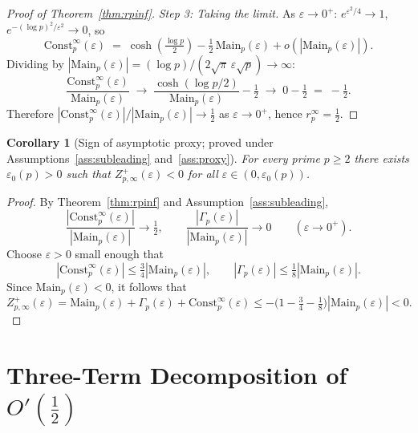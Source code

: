 \documentclass[11pt]{article}
\newtheorem{corollary}[theorem]{Corollary}
\begin{document}
\begin{proof}[Proof of Theorem~\ref{thm:rpinf}]
\textit{Step 3: Taking the limit.}
As $\varepsilon\to 0^+$: $e^{\varepsilon^2/4}\to 1$, $e^{-(\log p)^2/\varepsilon^2}\to 0$, so
\[
\mathrm{Const}_p^\infty(\varepsilon)
  \;=\; \cosh\!\left(\tfrac{\log p}{2}\right)
        - \tfrac12\,\mathrm{Main}_p(\varepsilon)
        + o\!\left(|\mathrm{Main}_p(\varepsilon)|\right).
\]
Dividing by $|\mathrm{Main}_p(\varepsilon)| = (\log p)/(2\sqrt{\pi}\,\varepsilon\sqrt{p})\to\infty$:
\[
\frac{\mathrm{Const}_p^\infty(\varepsilon)}{\mathrm{Main}_p(\varepsilon)}
  \;\longrightarrow\;
  \frac{\cosh(\log p/2)}{\mathrm{Main}_p(\varepsilon)} - \tfrac12
  \;\longrightarrow\; 0 - \tfrac12 \;=\; -\tfrac12.
\]
Therefore $|\mathrm{Const}_p^\infty(\varepsilon)|/|\mathrm{Main}_p(\varepsilon)|
\to\tfrac12$ as $\varepsilon\to 0^+$, hence $r_p^\infty=\tfrac12$.
\end{proof}

\begin{corollary}[Sign of asymptotic proxy; proved under
                  Assumptions~\ref{ass:subleading} and~\ref{ass:proxy}]
\label{cor:sign}
For every prime $p\ge 2$ there exists $\varepsilon_0(p)>0$ such that
$Z_{p,\infty}^+(\varepsilon)<0$ for all $\varepsilon\in(0,\varepsilon_0(p))$.
\end{corollary}

\begin{proof}
By Theorem~\ref{thm:rpinf} and Assumption~\ref{ass:subleading},
\[
\frac{|\mathrm{Const}_p^\infty(\varepsilon)|}{|\mathrm{Main}_p(\varepsilon)|}
  \to\tfrac12,
\qquad
\frac{|\Gamma_p(\varepsilon)|}{|\mathrm{Main}_p(\varepsilon)|}
  \to 0
\qquad(\varepsilon\to 0^+).
\]
Choose $\varepsilon>0$ small enough that
\[
|\mathrm{Const}_p^\infty(\varepsilon)|
  \le \tfrac34 |\mathrm{Main}_p(\varepsilon)|,
\qquad
|\Gamma_p(\varepsilon)|
  \le \tfrac18 |\mathrm{Main}_p(\varepsilon)|.
\]
Since $\mathrm{Main}_p(\varepsilon)<0$, it follows that
\[
Z_{p,\infty}^+(\varepsilon)
=\mathrm{Main}_p(\varepsilon)+\Gamma_p(\varepsilon)
 +\mathrm{Const}_p^\infty(\varepsilon)
\le -\bigl(1-\tfrac34-\tfrac18\bigr)|\mathrm{Main}_p(\varepsilon)|<0.
\]
\end{proof}

\section{\texorpdfstring{Three-Term Decomposition of $O'(\tfrac12)$}{Three-Term Decomposition of O'(1/2)}}
\label{sec:decomp}
\end{document}
